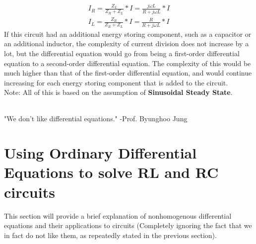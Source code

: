 \documentclass[nobib]{tufte-handout}
\begin{document}
\begin{align*}
    I_R=\frac{Z_L}{Z_R+Z_L}*I=\frac{j \omega L}{R+j \omega L}*I \\
    I_L=\frac{Z_R}{Z_R+Z_L}*I=\frac{R}{R+j \omega L}*I
\end{align*}
If this circuit had an additional energy storing component, such as a capacitor 
or an additional inductor, the complexity of current division does not increase 
by a lot, but the differential equation would go from being a first-order differential
equation to a second-order differential equation. The complexity of this would be much
higher than that of the first-order differential equation, and would continue increasing
for each energy storing component that is added to the circuit.\\
Note: All of this is based on the assumption of \textbf{Sinusoidal Steady State}.
\\~\\
\begin{center}
    "We don't like differential equations." -Prof. Byunghoo Jung
\end{center}
\pagebreak
\section{Using Ordinary Differential Equations to solve RL and RC circuits}
This section will provide a brief explanation of nonhomogenous differential
equations and their applications to circuits (Completely ignoring the fact that
we in fact do not like them, as repeatedly stated in the previous section).
\end{document}
